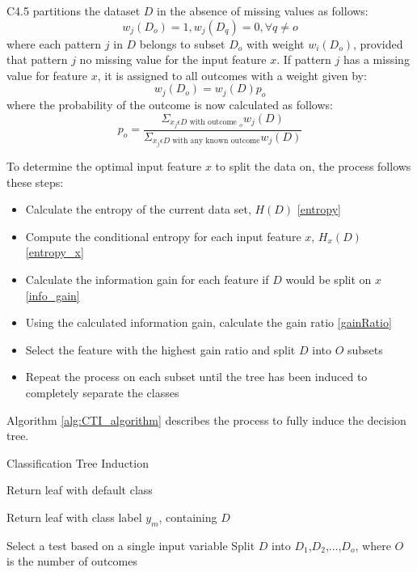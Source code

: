 \documentclass[10pt, conference]{IEEEtran}
\begin{document}
C4.5 partitions the dataset $D$ in the absence of missing values as follows: 
\begin{equation}
    w_j(D_o) = 1, w_j(D_q)=0, \forall q \neq o \label{no_missing}
\end{equation}
where each pattern $j$ in $D$ belongs to subset $D_o$ with weight $w_i(D_o)$, provided that pattern $j$ no missing value for the input
feature $x$. If pattern $j$ has a missing value for feature $x$, it is assigned to all outcomes with a weight given by:
\begin{equation}
    w_j(D_o) = w_j(D)p_o \label{with_missing}
\end{equation}
where the probability of the outcome is now calculated as follows:
\begin{equation}
    p_o = \frac{\Sigma_{x_j \epsilon D \text{ with outcome } _o} w_j(D)}{\Sigma_{x_j \epsilon D \text{ with any known outcome}} w_j(D)}
\end{equation}

To determine the optimal input feature $x$ to split the data on, the process follows these steps:
\begin{itemize}
    \item Calculate the entropy of the current data set, $H(D)$ \eqref{entropy}
    \item Compute the conditional entropy for each input feature $x$, $H_x(D)$ \eqref{entropy_x}
    \item Calculate the information gain for each feature if $D$ would be split on $x$ \eqref{info_gain}
    \item Using the calculated information gain, calculate the gain ratio \eqref{gainRatio}
    \item Select the feature with the highest gain ratio and split $D$ into $O$ subsets
    \item Repeat the process on each subset until the tree has been induced to completely separate the classes
\end{itemize}

Algorithm \ref{alg:CTI_algorithm} describes the process to fully induce the decision tree. 
\begin{algorithm}
    \caption{Classification Tree Induction}
    \label{alg:CTI_algorithm}
    \begin{algorithmic}[1]
                \State Return leaf with default class
            \EndIf
            
                \State Return leaf with class label $y_m$, containing $D$
            \EndIf{}

            \State Select a test based on a single input variable
            \State Split $D$ into $D_1$,$D_2$,...,$D_o$, where $O$ is the number of outcomes
                \State {}
            \EndFor
        \EndFunction
    \end{algorithmic}
\end{algorithm}
\end{document}
